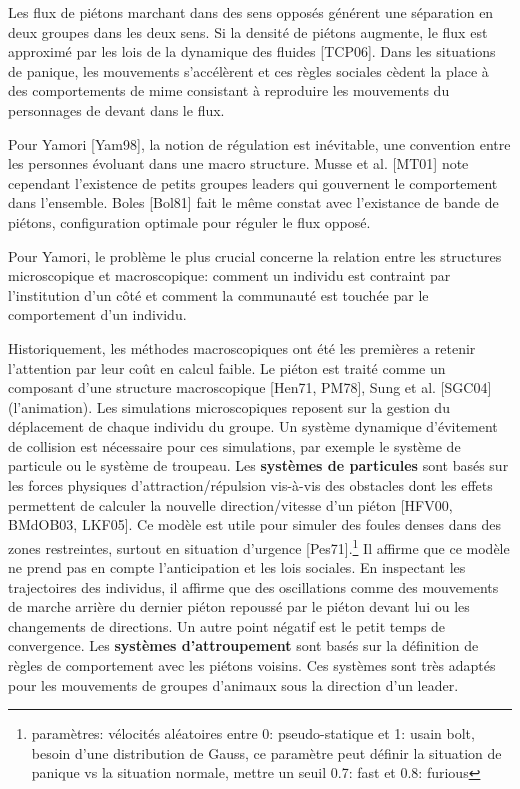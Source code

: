 \documentclass[11pt]{article}
\begin{document}
Les flux de piétons marchant dans des sens opposés générent une séparation en deux groupes dans les deux sens. Si la densité de piétons augmente, le flux est approximé par les lois de la dynamique des fluides [TCP06]. Dans les situations de panique, les mouvements s'accélèrent et ces règles sociales cèdent la place à des comportements de mime consistant à reproduire les mouvements du personnages de devant dans le flux.

Pour Yamori [Yam98], la notion de régulation est inévitable, une convention entre les personnes évoluant dans une macro structure. Musse et al. [MT01] note cependant l'existence de petits groupes leaders qui gouvernent le comportement dans l'ensemble. Boles [Bol81] fait le même constat avec l'existance de bande de piétons, configuration optimale pour réguler le flux opposé.

Pour Yamori, le problème le plus crucial concerne la relation entre les structures microscopique et macroscopique: comment un individu est contraint par l'institution d'un côté et comment la communauté est touchée par le comportement d'un individu. 

Historiquement, les méthodes macroscopiques ont été les premières a retenir l'attention par leur coût en calcul faible. Le piéton est traité comme un composant d'une structure macroscopique [Hen71, PM78], Sung et al. [SGC04] (l'animation).
Les simulations microscopiques reposent sur la gestion du déplacement de chaque individu du groupe. Un système dynamique d'évitement de collision est nécessaire pour ces simulations, par exemple le système de particule ou le système de troupeau. Les \textbf{systèmes de particules} sont basés sur les forces physiques d'attraction/répulsion vis-à-vis des obstacles dont les effets permettent de calculer la nouvelle direction/vitesse d'un piéton [HFV00, BMdOB03, LKF05]. Ce modèle est utile pour simuler des foules denses dans des zones restreintes, surtout en situation d'urgence [Pes71].\footnote{paramètres: vélocités aléatoires entre 0: pseudo-statique et 1: usain bolt, besoin d'une distribution de Gauss, ce paramètre peut définir la situation de panique vs la situation normale, mettre un seuil 0.7: fast et 0.8: furious}
Il affirme que ce modèle ne prend pas en compte l'anticipation et les lois sociales. En inspectant les trajectoires des individus, il affirme que des oscillations comme des mouvements de marche arrière du dernier piéton repoussé par le piéton devant lui ou les changements de directions. Un autre point négatif est le petit temps de convergence.
Les \textbf{systèmes d'attroupement} sont basés sur la définition de règles de comportement avec les piétons voisins. Ces systèmes sont très adaptés pour les mouvements de groupes d'animaux sous la direction d'un leader.
\end{document}
